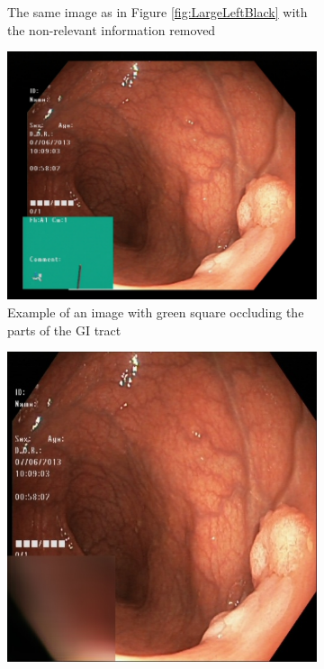 \begin{figure}
\begin{subfigure}[t]{0.4\textwidth}
         \caption{The same image as in Figure \ref{fig:LargeLeftBlack} with the non-relevant information removed}
         \label{fig:LargeLeftBlackFIX}
     \end{subfigure}
     \hfill
     \begin{subfigure}[t]{0.4\textwidth}
         \centering
         \includegraphics[height=\textwidth, width=\textwidth]{experiments/figures/greenframe.jpg}
         \caption{Example of an image with green square occluding the parts of the GI tract}
         \label{fig:GreenSquareOccluding}
     \end{subfigure}     
     \hfill
     \begin{subfigure}[t]{0.4\textwidth}
         \centering
         \includegraphics[height=\textwidth, width=\textwidth]{experiments/figures/nogreenframe.jpg}

\end{subfigure}
\end{figure}
